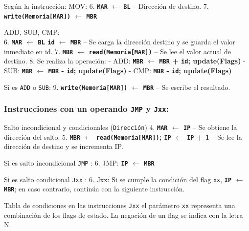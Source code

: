 \documentclass[12pt,oneside]{templates/unerthesis}
\begin{document}
Según la instrucción:
MOV:
6. \textbf{\texttt{MAR} \(\leftarrow\) \texttt{BL}} -- Dirección de destino.
7. \textbf{\texttt{write(Memoria{[}MAR{]})} \(\leftarrow\) \texttt{MBR}}

ADD, SUB, CMP:\\
6. \textbf{\texttt{MAR} \(\leftarrow\) \texttt{BL} \textbar{} \texttt{id} \(\leftarrow\) \texttt{MBR}} -- Se carga la dirección destino y se guarda el valor inmediato en id.
7. \textbf{\texttt{MBR} \(\leftarrow\) \texttt{read(Memoria{[}MAR{]})}} -- Se lee el valor actual de destino.
8. Se realiza la operación:
- ADD: \textbf{\texttt{MBR} \(\leftarrow\) \texttt{MBR} + \texttt{id}; update(Flags)}
- SUB: \textbf{\texttt{MBR} \(\leftarrow\) \texttt{MBR} - \texttt{id}; update(Flags)}
- CMP: \textbf{\texttt{MBR} - \texttt{id}; update(Flags)}

Si es \texttt{ADD} o \texttt{SUB}:
9. \textbf{\texttt{write(Memoria{[}MAR{]})} \(\leftarrow\) \texttt{MBR}} -- Se escribe el resultado.

\hypertarget{instrucciones-con-un-operando-jmp-y-jxx}{%
\subsubsection{\texorpdfstring{Instrucciones con un operando \texttt{JMP} y \texttt{Jxx}:}{Instrucciones con un operando JMP y Jxx:}}\label{instrucciones-con-un-operando-jmp-y-jxx}}

Salto incondicional y condicionales (\texttt{Dirección})
4. \textbf{\texttt{MAR} \(\leftarrow\) \texttt{IP}} -- Se obtiene la dirección del salto.
5. \textbf{\texttt{MBR} \(\leftarrow\) \texttt{read(Memoria{[}MAR{]})}; \texttt{IP} \(\leftarrow\) \texttt{IP} + 1} -- Se lee la dirección de destino y se incrementa IP.

Si es salto incondicional \texttt{JMP} :
6. JMP: \textbf{\texttt{IP} \(\leftarrow\) \texttt{MBR}}

Si es salto condicional \texttt{Jxx} :
6. Jxx: Si se cumple la condición del flag \texttt{xx}, \textbf{\texttt{IP} \(\leftarrow\) \texttt{MBR}}; en caso contrario, continúa con la siguiente instrucción.

Tabla de condiciones en las instrucciones \texttt{Jxx} el parámetro \texttt{xx} representa una combinación de los flags de estado. La negación de un flag se indica con la letra N.
\end{document}
